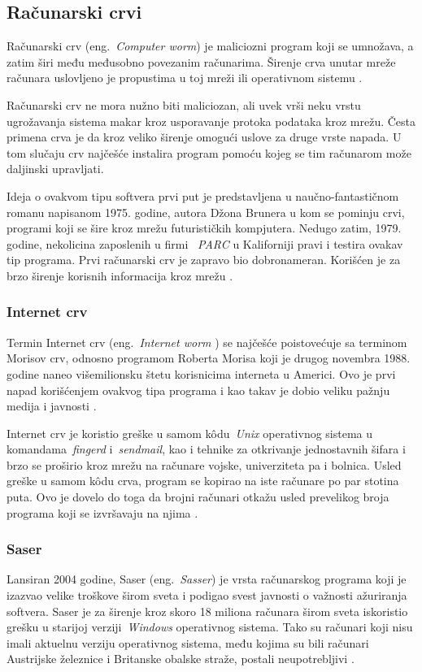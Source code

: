 \documentclass[a4paper]{article}
\begin{document}
\subsection{Računarski crvi}
Računarski crv (eng.~{\em Computer worm}) je maliciozni program koji se umnožava, a zatim širi među međusobno povezanim računarima. Širenje crva unutar mreže računara uslovljeno je propustima u toj mreži ili operativnom sistemu \cite{norton_worm, ethics}.

Računarski crv ne mora nužno biti maliciozan, ali uvek vrši neku vrstu ugrožavanja sistema makar kroz usporavanje protoka podataka kroz mrežu. Česta primena crva je da kroz veliko širenje omogući uslove za druge vrste napada. U tom slučaju crv najčešće instalira program pomoću kojeg se tim računarom može daljinski upravljati. \cite{ethics}

Ideja o ovakvom tipu softvera prvi put je predstavljena u naučno-fantastičnom romanu napisanom 1975. godine, autora Džona Brunera u kom se pominju crvi, programi koji se šire kroz mrežu futurističkih kompjutera. Nedugo zatim, 1979. godine, nekolicina zaposlenih u firmi ~{\em PARC } u Kaliforniji pravi i testira ovakav tip programa.
Prvi računarski crv je zapravo bio dobronameran. Korišćen je za brzo širenje korisnih informacija kroz mrežu \cite{internet_worm}. 


\subsubsection{Internet crv}

Termin Internet crv  (eng.~{\em Internet worm }) se najčešće poistovećuje sa terminom Morisov crv, odnosno programom Roberta Morisa koji je drugog novembra 1988. godine naneo višemilionsku štetu korisnicima interneta u Americi. Ovo je prvi napad korišćenjem ovakvog tipa programa i kao takav je dobio veliku pažnju medija i javnosti \cite{ethics}.

Internet crv je koristio greške u samom kôdu~{\em Unix} operativnog sistema u komandama~{\em fingerd} i~{\em sendmail}, kao i tehnike za otkrivanje jednostavnih šifara i brzo se proširio kroz mrežu na računare vojske, univerziteta pa i bolnica. Usled greške u samom kôdu crva, program se kopirao na iste računare po par stotina puta. Ovo je dovelo do toga da brojni računari otkažu usled prevelikog broja programa koji se izvršavaju na njima \cite{internet_worm}.


\subsubsection{Saser}
Lansiran 2004 godine, Saser (eng.~{\em Sasser}) je vrsta računarskog programa koji je izazvao velike troškove širom sveta i podigao svest javnosti o važnosti ažuriranja softvera. Saser je za širenje kroz skoro 18 miliona računara širom sveta iskoristio grešku u starijoj verziji~{\em Windows} operativnog sistema. Tako su računari koji nisu imali aktuelnu verziju operativnog sistema, među kojima su bili računari Austrijske železnice i Britanske obalske straže, postali neupotrebljivi \cite{ethics}.
\end{document}
